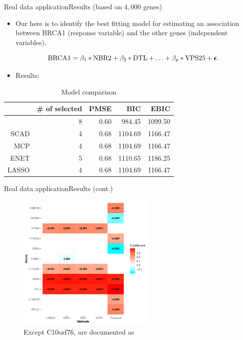 \documentclass[citecolor=blue,10pt]{beamer}
\newcommand{\0} {\mbox{\boldmath$0$}}
\newcommand{\uepsilon} {\mbox{\boldmath $\epsilon$}}
\begin{document}
\begin{frame}{Real data application}{Results (based on $4,000$ genes)}
\begin{itemize}
\item Our {\color{red}{goal}} here is to identify the best fitting model for estimating an association between BRCA1 (response variable) and the other genes (independent variables). 

$$\text{BRCA1} = \beta_1*\text{NBR2} + \beta_2*\text{DTL} + \ldots + \beta_p*\text{VPS25}+\uepsilon.$$
\item Results: 
\end{itemize}
\begin{table}[ht]
 \centering
 \caption{Model comparison}\label{T:realdata}
 \begin{tabular}{rrrrr}
  \hline
           & \# of selected  & PMSE & BIC     & EBIC    \\
  \hline
  {\color{red}{Proposed}} & 8 & 0.60      & 984.45  & 1099.50 \\
  SCAD     & 4 & 0.68      & 1104.69 & 1166.47 \\
  MCP      & 4 & 0.68      & 1104.69 & 1166.47 \\
  ENET     & 5 & 0.68      & 1110.65 & 1186.25 \\
  LASSO    & 4 & 0.68      & 1104.69 & 1166.47 \\
  \hline
 \end{tabular}
\end{table}
\end{frame}
\begin{frame}{Real data application}{Results (cont.)}
\begin{figure}
 \centering
 \includegraphics[width=0.6\textwidth,height=0.55\textwidth]{Heatmap.pdf}
 \caption{Except C10orf76, {\color{red}{7 genes}} are documented as {\color{red}{diseases-related genes}}}
\end{figure}

\end{frame}
\end{document}
